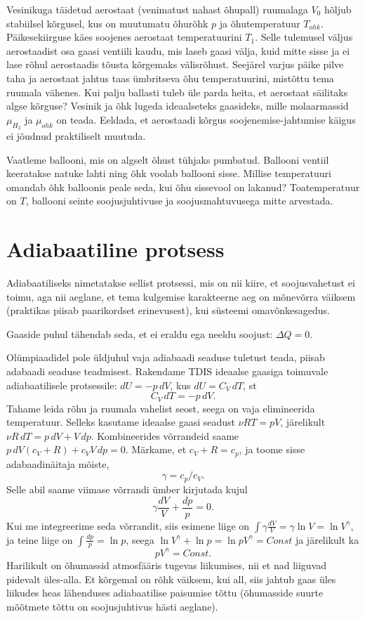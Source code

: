 \documentclass[a4paper,11pt,twocolumn]{article}
\begin{document}
\begin{question}[Lõppv 2006, G6]
	Vesinikuga täidetud aerostaat (venimatust nahast õhupall) ruumalaga \( V_0 \) hõljub stabiilsel kõrgusel, kus on muutumatu õhurõhk \( p \) ja õhutemperatuur \( T_{ohk} \). Päikesekiirguse käes soojenes aerostaat temperatuurini \( T_1 \). Selle tulemusel väljus aerostaadist osa gaasi ventiili kaudu, mis laseb gaasi välja, kuid mitte sisse ja ei lase rõhul aerostaadis tõusta kõrgemaks välisrõhust. Seejärel varjus päike pilve taha ja aerostaat jahtus taas ümbritseva õhu temperatuurini, mistõttu tema ruumala vähenes. Kui palju ballasti tuleb üle parda heita, et aerostaat säilitaks algse kõrguse? Vesinik ja õhk lugeda ideaalseteks gaasideks, mille molaarmassid \( \mu _{H_{2}} \) ja \( \mu_{ohk} \) on teada. Eeldada, et aerostaadi kõrgus soojenemise-jahtumise käigus ei jõudnud praktiliselt muutuda.
\end{question}
\begin{question}
	Vaatleme ballooni, mis on algselt õhust tühjaks pumbatud. Ballooni ventiil keeratakse natuke lahti ning õhk voolab ballooni sisse. Millise temperatuuri omandab õhk balloonis peale seda, kui õhu sissevool on lakanud? Toatemperatuur on \( T \), ballooni seinte soojusjuhtivuse ja soojusmahtuvusega mitte arvestada.
\end{question}

\section{Adiabaatiline protsess}
Adiabaatiliseks nimetatakse sellist protsessi, mis on
nii kiire, et soojusvahetust ei toimu, aga nii aeglane, et tema kulgemise karakteerne aeg on mõnevõrra väiksem (praktikas piisab paarikordset erinevusest), kui süsteemi omavõnkesagedus.

Gaaside puhul tähendab seda, et ei eraldu ega neeldu soojust: \( \Delta Q=0 \).

Olümpiaadidel pole üldjuhul vaja adiabaadi seaduse tuletust teada, piisab adabaadi seaduse teadmisest. Rakendame TDIS ideaalse gaasiga toimuvale adiabaatilisele protsessile: \( dU=-p\, dV \), kus \( dU=C_V \, dT \), st \[ C_V  \, dT=-p\, dV .\]
Tahame leida rõhu ja ruumala vahelist seost, seega on vaja elimineerida temperatuur. Selleks kasutame ideaalse gaasi seadust \( \nu RT=pV \), järelikult \( \nu R\,dT=p\, dV+V\, dp. \) Kombineerides võrrandeid saame \( p\,dV(c_V+R)+c_V V\, dp=0. \) Märkame, et \( c_V+R=c_p \), ja toome sisse adabaadinäitaja mõiste, 
\[ \gamma=c_p/c_V. \]
Selle abil saame viimase võrrandi ümber kirjutada kujul
\[ \gamma \frac{dV}{V}+\frac{dp}{p}=0. \]
Kui me integreerime seda võrrandit, siis esimene liige on \( \int \gamma \frac{dV}{V}=\gamma \ln V=\ln V^\gamma \), ja teine liige on \( \int \frac{dp}{p}=\ln p \), seega \( \ln V^\gamma +\ln p=\ln pV^\gamma=Const \) ja järelikult ka 
\[ pV^\gamma=Const. \]
Harilikult on õhumassid atmosfääris tugevas liikumises, nii et nad liiguvad pidevalt üles-alla. Et kõrgemal on rõhk väiksem, kui all, siis jahtub gaas üles liikudes heas lähenduses adiabaatilise paisumise tõttu (õhumasside suurte mõõtmete tõttu on
soojusjuhtivus hästi aeglane).
\end{document}
